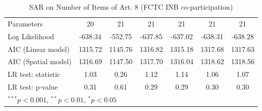 \begin{table}[!h]
\begin{center}
\begin{tabular}{l c c c c c c }
Parameters              & 20           & 21           & 21           & 21           & 21           & 21           \\
Log Likelihood          & -638.34      & -552.75      & -637.85      & -637.02      & -638.31      & -638.28      \\
AIC (Linear model)      & 1315.72      & 1145.76      & 1316.82      & 1315.18      & 1317.68      & 1317.63      \\
AIC (Spatial model)     & 1316.69      & 1147.50      & 1317.70      & 1316.04      & 1318.62      & 1318.56      \\
LR test: statistic      & 1.03         & 0.26         & 1.12         & 1.14         & 1.06         & 1.07         \\
LR test: p-value        & 0.31         & 0.61         & 0.29         & 0.29         & 0.30         & 0.30         \\
\bottomrule
\multicolumn{7}{l}{\scriptsize{$^{***}p<0.001$, $^{**}p<0.01$, $^*p<0.05$}}
\end{tabular}
\caption{SAR on Number of Items of Art. 8 (FCTC INB co-participation)}
\label{table:coefficients}
\end{center}
\end{table}
